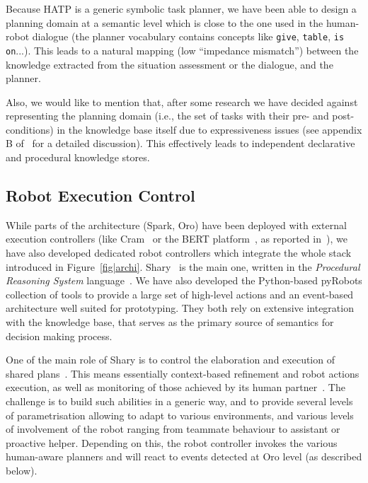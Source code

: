 \documentclass[preprint,3p,times]{elsarticle}
\newcommand{\ie}{{i.e.\xspace}}
\begin{document}
Because HATP is a generic symbolic task planner, we have been able to design a
planning domain at a semantic level which is close to the one used in the
human-robot dialogue (the planner vocabulary contains concepts like
\texttt{give}, \texttt{table}, \texttt{is on}...). This leads to a natural
mapping (low ``impedance mismatch'') between the knowledge extracted from the situation
assessment or the dialogue, and the planner.

Also, we would like to mention that, after some research we have decided against
representing the planning domain (\ie, the set of tasks with their pre- and
post-conditions) in the knowledge base itself due to expressiveness issues (see
appendix B of~\cite{Lemaignan2012a} for a detailed discussion). This effectively
leads to independent declarative and procedural knowledge stores.

\subsection{Robot Execution Control}
\label{sect|ctrl}

While parts of the architecture ({\sc Spark}, {\sc Oro}) have been deployed with
external execution controllers (like {\sc Cram}~\cite{Beetz2010} or the BERT
platform~\cite{Lallee2010b}, as reported in~\cite{Lemaignan2010}), we have also
developed dedicated robot controllers which integrate the whole stack introduced
in Figure~\ref{fig|archi}. {\sc Shary}~\cite{clodic2008shary} is the main one,
written in the \emph{Procedural Reasoning System} language~\cite{Ingrand1996}.
We have also developed the Python-based {\sc pyRobots} collection of tools to
provide a large set of high-level actions and an event-based architecture well
suited for prototyping.  They both rely on extensive integration with the knowledge
base, that serves as the primary source of semantics for decision making process.

One of the main role of {\sc Shary} is to control the elaboration and execution
of shared plans~\cite{Grosz1996,Clark1996,Kemp2007}. This means essentially
context-based refinement and robot actions execution, as well as monitoring of
those achieved by its human partner~\cite{Breazeal2003}. The challenge is to
build such abilities in a generic way, and to provide several levels of
parametrisation allowing to adapt to various environments, and various levels of
involvement of the robot ranging from teammate behaviour to assistant or
proactive helper.  Depending on this, the robot controller invokes the various
human-aware planners and will react to events detected at {\sc Oro} level (as
described below).
\end{document}
